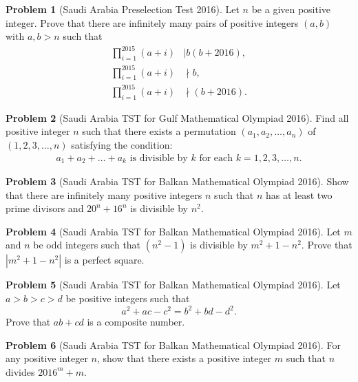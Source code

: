 \documentclass[]{article}
\theoremstyle{definition}
\newtheorem{problem}{Problem}
\begin{document}
\begin{problem}[Saudi Arabia Preselection Test 2016]
	Let $n$ be a given positive integer. Prove that there are infinitely many pairs of positive integers $(a, b)$ with $a, b > n$ such that
		\begin{align*}
			\prod_{i=1}^{2015} (a+i) &\mid b(b+2016),\\
			\prod_{i=1}^{2015} (a+i) &\nmid b,\\
			\prod_{i=1}^{2015} (a+i) &\nmid (b+2016).
		\end{align*}
\end{problem}



\begin{problem}[Saudi Arabia TST for Gulf Mathematical Olympiad 2016]
	Find all positive integer $n$ such that there exists a permutation $(a_1, a_2,\dots , a_n)$ of $(1, 2,3, \dots, n)$ satisfying the condition:
		\begin{align*}
			a_1 + a_2 + \dots+ a_k \text{ is divisible by } k \text{ for each } k = 1,2, 3,\dots, n.
		\end{align*}
\end{problem}



\begin{problem}[Saudi Arabia TST for Balkan Mathematical Olympiad 2016]
	Show that there are infinitely many positive integers $n$ such that $n$ has at least two prime divisors and $20^n + 16^n$ is divisible by $n^2$.
\end{problem}



\begin{problem}[Saudi Arabia TST for Balkan Mathematical Olympiad 2016]
	Let $m$ and $n$ be odd integers such that $(n^2 - 1)$ is divisible by $m^2 + 1 - n^2$. Prove that $|m^2 + 1 - n^2|$ is a perfect square.
\end{problem}




\begin{problem}[Saudi Arabia TST for Balkan Mathematical Olympiad 2016]
	Let $a > b > c > d$ be positive integers such that $$a^2 + ac - c^2 = b^2 + bd - d^2.$$ Prove that $ab + cd$ is a composite number.
\end{problem}


\begin{problem}[Saudi Arabia TST for Balkan Mathematical Olympiad 2016]
	For any positive integer $n$, show that there exists a positive integer $m$ such that $n$ divides $2016^m + m$.
\end{problem}
\end{document}
